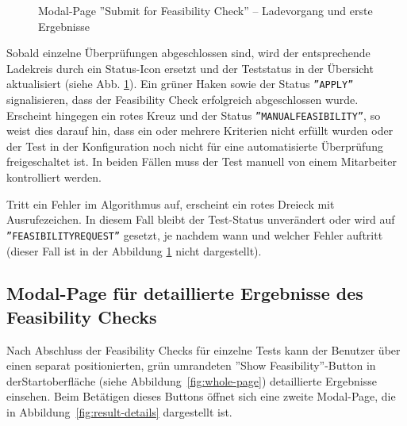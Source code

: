 \begin{figure}[!htbp] 
    \centering 
    \caption{Modal-Page ''Submit for Feasibility Check'' – Ladevorgang und erste Ergebnisse} 
    \label{fig:loading-with-results} 
\end{figure}

Sobald einzelne Überprüfungen abgeschlossen sind, wird der entsprechende Ladekreis durch ein Status-Icon ersetzt und der Teststatus in der Übersicht aktualisiert (siehe Abb. \ref{fig:loading-with-results}). Ein grüner Haken sowie der Status \texttt{''APPLY''} signalisieren, dass der Feasibility Check erfolgreich abgeschlossen wurde. Erscheint hingegen ein rotes Kreuz und der Status \texttt{''MANUALFEASIBILITY''}, so weist dies darauf hin, dass ein oder mehrere Kriterien nicht erfüllt wurden oder der Test in der Konfiguration noch nicht für eine automatisierte Überprüfung freigeschaltet ist. In beiden Fällen muss der Test manuell von einem Mitarbeiter kontrolliert werden.

Tritt ein Fehler im Algorithmus auf, erscheint ein rotes Dreieck mit Ausrufezeichen. In diesem Fall bleibt der Test-Status unverändert oder wird auf \texttt{''FEASIBILITY\-REQUEST''} gesetzt, je nachdem wann und welcher Fehler auftritt (dieser Fall ist in der Abbildung \ref{fig:loading-with-results} nicht dargestellt).


\subsection{Modal-Page für detaillierte Ergebnisse des Feasibility Checks}

Nach Abschluss der Feasibility Checks für einzelne Tests kann der Benutzer über einen separat positionierten, grün umrandeten ''Show Feasibility''-Button in der\linebreak Startoberfläche (siehe Abbildung~\ref{fig:whole-page}) detaillierte Ergebnisse einsehen. Beim Betätigen dieses Buttons öffnet sich eine zweite Modal-Page, die in Abbildung~\ref{fig:result-details} dargestellt ist.

